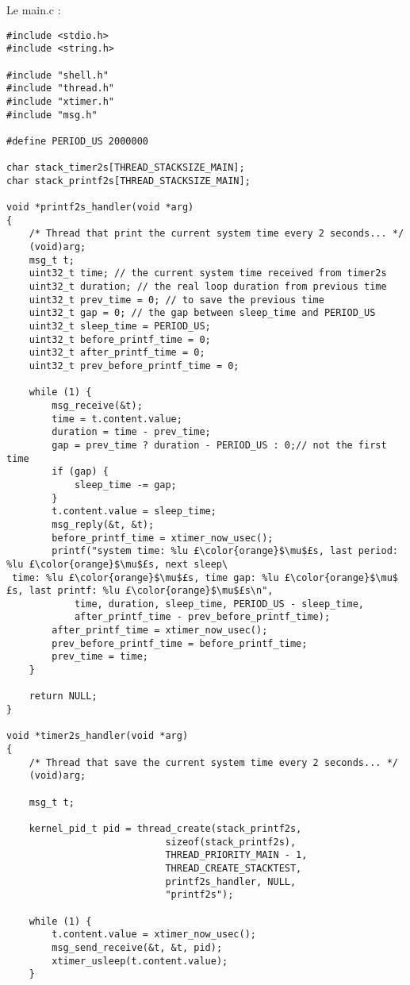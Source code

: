 Le main.c :
\begin{lstlisting}
#include <stdio.h>
#include <string.h>

#include "shell.h"
#include "thread.h"
#include "xtimer.h"
#include "msg.h"

#define PERIOD_US 2000000

char stack_timer2s[THREAD_STACKSIZE_MAIN];
char stack_printf2s[THREAD_STACKSIZE_MAIN];

void *printf2s_handler(void *arg)
{
    /* Thread that print the current system time every 2 seconds... */
    (void)arg;
    msg_t t;
    uint32_t time; // the current system time received from timer2s
    uint32_t duration; // the real loop duration from previous time
    uint32_t prev_time = 0; // to save the previous time
    uint32_t gap = 0; // the gap between sleep_time and PERIOD_US
    uint32_t sleep_time = PERIOD_US;
    uint32_t before_printf_time = 0;
    uint32_t after_printf_time = 0;
    uint32_t prev_before_printf_time = 0;

    while (1) {
        msg_receive(&t);
        time = t.content.value;
        duration = time - prev_time;
        gap = prev_time ? duration - PERIOD_US : 0;// not the first time
        if (gap) {
            sleep_time -= gap;
        }
        t.content.value = sleep_time;
        msg_reply(&t, &t);
        before_printf_time = xtimer_now_usec();
        printf("system time: %lu £\color{orange}$\mu$£s, last period: %lu £\color{orange}$\mu$£s, next sleep\
 time: %lu £\color{orange}$\mu$£s, time gap: %lu £\color{orange}$\mu$£s, last printf: %lu £\color{orange}$\mu$£s\n",
            time, duration, sleep_time, PERIOD_US - sleep_time,
            after_printf_time - prev_before_printf_time);
        after_printf_time = xtimer_now_usec();
        prev_before_printf_time = before_printf_time;
        prev_time = time;
    }
    
    return NULL;
}

void *timer2s_handler(void *arg)
{
    /* Thread that save the current system time every 2 seconds... */
    (void)arg;

    msg_t t;
    
    kernel_pid_t pid = thread_create(stack_printf2s,
                            sizeof(stack_printf2s),
                            THREAD_PRIORITY_MAIN - 1,
                            THREAD_CREATE_STACKTEST,
                            printf2s_handler, NULL,
                            "printf2s");
    
    while (1) {
        t.content.value = xtimer_now_usec();
        msg_send_receive(&t, &t, pid);
        xtimer_usleep(t.content.value);
    }


\end{lstlisting}
